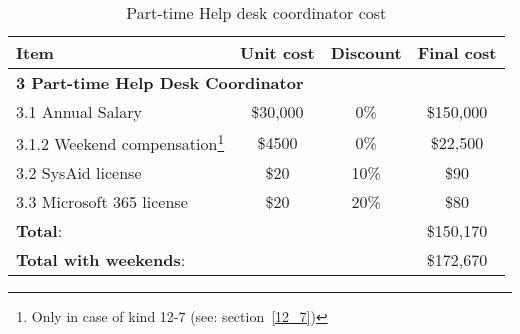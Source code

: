 \begin{minipage}{15cm}
	\begin{table}[H]
		\centering
		\begin{tabular}{|l|c|c|c|} 
			\hline
			\textbf{Item} & \textbf{Unit cost} & \textbf{Discount} & \textbf{Final cost}   \\
			\hline
			\multicolumn{4}{|l|}{\textbf{3 Part-time Help Desk Coordinator}}\\
			\hline
			\hspace{2mm}3.1  Annual Salary & \$30,000 & 0\% & \$150,000\\
			\hline
			\hspace{4mm}3.1.2 Weekend compensation\footnote{Only in case of kind 12{-}7 (see: section~\ref{12_7})}& \$4500 & 0\% & \$22,500 \\
			\hline
			\hspace{2mm}3.2 SysAid license & \$20 & 10\% & \$90 \\
			\hline
			\hspace{2mm}3.3 Microsoft 365 license  & \$20 & 20\% & \$80 \\
			\hline
			\multicolumn{3}{|l|}{\textbf{Total}:} & \$150,170\\
			\hline
			\multicolumn{3}{|l|}{\textbf{Total with weekends}:} & \$172,670\\
			\hline
		\end{tabular}
		\caption{Part-time Help desk coordinator cost}\label{tab:part_time_coordinator_cost}
	\end{table}
\end{minipage}


